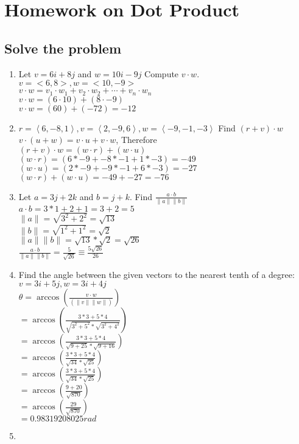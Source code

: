 \documentclass[]{article}
\begin{document}
\section*{Homework on Dot Product}

\subsection*{Solve the problem}
\begin{enumerate}
    \item Let $v = 6i + 8j$ and $w = 10i-9j$ Compute $v\cdot w$.\\
    $v = <6,8>, w=<10,-9>$\\
    $v\cdot w = v_1 \cdot w_1 + v_2 \cdot w_2 + \cdots + v_n \cdot w_n$\\
    $v \cdot w = (6 \cdot 10) + (8 \cdot -9)$\\
    $v \cdot w = (60) + (-72) = -12$
    \item $r=\left\langle6,-8,1\right\rangle, v=\left\langle2,-9,6\right\rangle, w=\left\langle-9,-1,-3\right\rangle$ Find $(r+v)\cdot w$\\
    $v \cdot (u + w) = v \cdot u + v \cdot w$, Therefore \\
    $(r+v)\cdot w = (w \cdot r) + (w \cdot u)$\\
    $(w \cdot r) = (6*-9+-8*-1+1*-3) = -49$\\
    $(w \cdot u) = (2*-9+-9*-1+6*-3) = -27$\\
    $(w \cdot r) + (w \cdot u) = -49+-27 = -76$
    
    \item Let $a = 3j + 2k$ and $b = j+k$. Find $\frac{a\cdot b}{\|a\|\|b\|}$\\
    $a\cdot b = 3*1 + 2+1 = 3+2 = 5$\\
    $\|a\| = \sqrt{3^2 + 2^2} = \sqrt{13}$\\
    $\|b\| = \sqrt{1^2 + 1^2} = \sqrt{2}$\\
    $\|a\|\|b\| = \sqrt{13}* \sqrt{2} = \sqrt{26}$\\
    $\frac{a\cdot b}{\|a\|\|b\|} = \frac{5}{\sqrt{26}} \equiv \frac{5\sqrt{26}}{26}$
    \item Find the angle between the given vectors to the nearest tenth of a degree:
        $v = 3i + 5j, w=3i+4j$\\
        $\theta = \arccos(\frac{v\cdot w}{(\|v\|\|w\|)})$\\
        $= \arccos(\frac{3*3 + 5*4}{\sqrt{3^2+5^2}*\sqrt{3^2+4^2}})$\\
        $= \arccos(\frac{3*3 + 5*4}{\sqrt{9+25}*\sqrt{9+16}})$\\
        $= \arccos(\frac{3*3 + 5*4}{\sqrt{34}*\sqrt{25}})$\\
        $= \arccos(\frac{3*3 + 5*4}{\sqrt{34}*\sqrt{25}})$\\
        $= \arccos(\frac{9 + 20}{\sqrt{870}})$\\
        $= \arccos(\frac{29}{\sqrt{870}})$\\
        $= 0.98319208025 rad$\\
    \item 
    
\end{enumerate}
\end{document}
